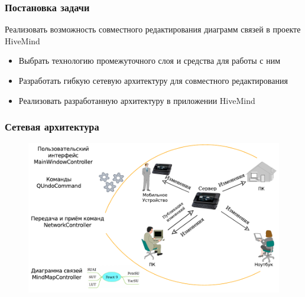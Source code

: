 \documentclass[unicode]{beamer}
\begin{document}
\begin{frame}
\begin{figure}[h!]
\begin{minipage}[h]{0.45\linewidth}
\end{minipage}
\hfill
\begin{minipage}[h]{0.45\linewidth}
\end{minipage}
\end{figure}
\end{frame}


\begin{frame}
\transwipe[direction=90]
\frametitle{Постановка задачи}
\begin{block}{Реализовать возможность совместного редактирования диаграмм связей
в проекте HiveMind}
  \begin{itemize}
    \item Выбрать технологию промежуточного слоя и средства для работы с ним
    \item Разработать гибкую сетевую архитектуру для совместного редактирования
    \item Реализовать разработанную архитектуру в приложении HiveMind
  \end{itemize}
\end{block}
\end{frame}

\begin{frame}
\transwipe[direction=90]
\frametitle{Сетевая архитектура}
\begin{figure}[h!] 
\centering
\includegraphics[width=\linewidth]{application-layers-improved} 
\end{figure}
\end{frame}
\end{document}
